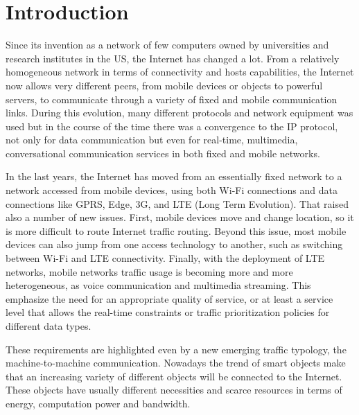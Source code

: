 \chapter{Introduction}
\label{chap:intro}
Since its invention as a network of few computers owned by universities and
research institutes in the US, the Internet has changed a lot. From a
relatively homogeneous network in terms of connectivity and hosts capabilities,
the Internet now allows very different peers, from mobile devices or objects to
powerful servers, to communicate through a variety of fixed and mobile
communication links. During this evolution, many different protocols and
network equipment was used but in the course of the time there was a
convergence to the IP protocol, not only for data communication but even for
real-time, multimedia, conversational communication services in both fixed and
mobile networks.

In the last years, the Internet has moved from an essentially fixed network to
a network accessed from mobile devices, using both Wi-Fi connections and data
connections like GPRS, Edge, 3G, and LTE (Long Term Evolution). That raised
also a number of new issues. First, mobile devices move and change location, so
it is more difficult to route Internet traffic routing. Beyond this issue, most
mobile devices can also jump from one access technology to another, such as
switching between Wi-Fi and LTE connectivity. Finally, with the deployment of
LTE networks, mobile networks traffic usage is becoming more and more
heterogeneous, as voice communication and multimedia streaming. This emphasize
the need for an appropriate quality of service, or at least a service level
that allows the real-time constraints or traffic prioritization policies for
different data types.

These requirements are highlighted even by a new emerging traffic typology, the
machine-to-machine communication. Nowadays the trend of smart objects make that
an increasing variety of different objects will be connected to the Internet.
These objects have usually different necessities and scarce resources in terms
of energy, computation power and bandwidth.

